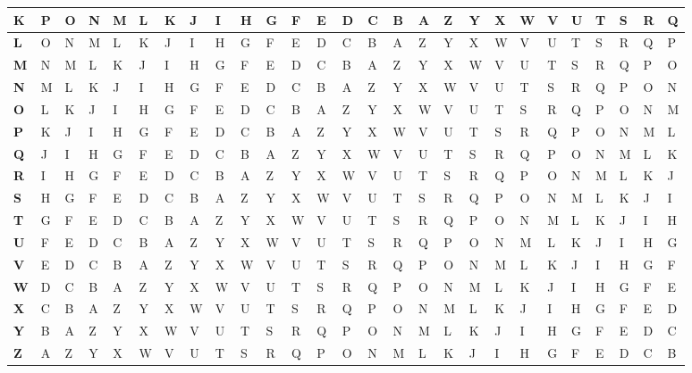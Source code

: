 \begin{table}[h!]
{\begin{tabular}{l|l|l|l|l|l|l|l|l|l|l|l|l|l|l|l|l|l|l|l|l|l|l|l|l|l|l|}
\multicolumn{1}{|l|}{\textbf{K}} & P & O & N & M & L & K & J & I & H & G & F & E & D & C & B & A & Z & Y & X & W & V & U & T & S & R & Q \\ \hline
\multicolumn{1}{|l|}{\textbf{L}} & O & N & M & L & K & J & I & H & G & F & E & D & C & B & A & Z & Y & X & W & V & U & T & S & R & Q & P \\ \hline
\multicolumn{1}{|l|}{\textbf{M}} & N & M & L & K & J & I & H & G & F & E & D & C & B & A & Z & Y & X & W & V & U & T & S & R & Q & P & O \\ \hline
\multicolumn{1}{|l|}{\textbf{N}} & M & L & K & J & I & H & G & F & E & D & C & B & A & Z & Y & X & W & V & U & T & S & R & Q & P & O & N \\ \hline
\multicolumn{1}{|l|}{\textbf{O}} & L & K & J & I & H & G & F & E & D & C & B & A & Z & Y & X & W & V & U & T & S & R & Q & P & O & N & M \\ \hline
\multicolumn{1}{|l|}{\textbf{P}} & K & J & I & H & G & F & E & D & C & B & A & Z & Y & X & W & V & U & T & S & R & Q & P & O & N & M & L \\ \hline
\multicolumn{1}{|l|}{\textbf{Q}} & J & I & H & G & F & E & D & C & B & A & Z & Y & X & W & V & U & T & S & R & Q & P & O & N & M & L & K \\ \hline
\multicolumn{1}{|l|}{\textbf{R}} & I & H & G & F & E & D & C & B & A & Z & Y & X & W & V & U & T & S & R & Q & P & O & N & M & L & K & J \\ \hline
\multicolumn{1}{|l|}{\textbf{S}} & H & G & F & E & D & C & B & A & Z & Y & X & W & V & U & T & S & R & Q & P & O & N & M & L & K & J & I \\ \hline
\multicolumn{1}{|l|}{\textbf{T}} & G & F & E & D & C & B & A & Z & Y & X & W & V & U & T & S & R & Q & P & O & N & M & L & K & J & I & H \\ \hline
\multicolumn{1}{|l|}{\textbf{U}} & F & E & D & C & B & A & Z & Y & X & W & V & U & T & S & R & Q & P & O & N & M & L & K & J & I & H & G \\ \hline
\multicolumn{1}{|l|}{\textbf{V}} & E & D & C & B & A & Z & Y & X & W & V & U & T & S & R & Q & P & O & N & M & L & K & J & I & H & G & F \\ \hline
\multicolumn{1}{|l|}{\textbf{W}} & D & C & B & A & Z & Y & X & W & V & U & T & S & R & Q & P & O & N & M & L & K & J & I & H & G & F & E \\ \hline
\multicolumn{1}{|l|}{\textbf{X}} & C & B & A & Z & Y & X & W & V & U & T & S & R & Q & P & O & N & M & L & K & J & I & H & G & F & E & D \\ \hline
\multicolumn{1}{|l|}{\textbf{Y}} & B & A & Z & Y & X & W & V & U & T & S & R & Q & P & O & N & M & L & K & J & I & H & G & F & E & D & C \\ \hline
\multicolumn{1}{|l|}{\textbf{Z}} & A & Z & Y & X & W & V & U & T & S & R & Q & P & O & N & M & L & K & J & I & H & G & F & E & D & C & B \\ \hline
\end{tabular}%
}
\end{table}


